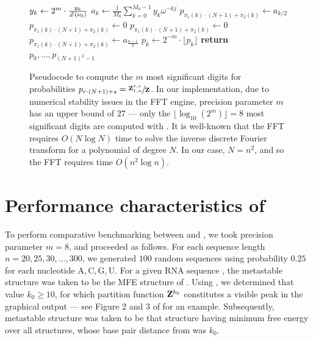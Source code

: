 \begin{figure}[!ht]
\begin{algorithmic}[1]
\State $y_k \gets 2^m \cdot \frac{y_k}{{\mathcal Z}_{}(\nu_0)}$
\EndFor
{}
\State $a_k \gets \frac{1}{M_0} \sum_{k=0}^{M_0-1} y_k \omega^{-kj}$
\EndFor
{}
\State $p_{\pi_1(k) \cdot (N+1) + \pi_2(k)} \gets a_{k/2}$
\Else
\State $p_{\pi_1(k) \cdot (N+1) + \pi_2(k)} \gets 0$
\EndIf
\Else
{}
\State $p_{\pi_1(k) \cdot (N+1) + \pi_2(k)} \gets 0$
\Else
\State $p_{\pi_1(k) \cdot (N+1) + \pi_2(k)} \gets a_{\frac{k-1}{2}}$
\EndIf
\EndIf
\EndFor
{}
\State $p_k \gets 2^{-m} \cdot \lfloor p_k \rfloor$
\EndFor
\State \textbf{return} $p_0,\dots,p_{(N + 1)^2 - 1}$
\EndFunction
\rule[-0.35ex]{0pt}{0pt}
\end{algorithmic}
\caption{
Pseudocode to compute the $m$ most significant digits
for probabilities
$p_{r\cdot(N + 1)+s} = \sfrac{{\bf Z}^{r,s}_{1,n}}{{\bf Z}^{}_{}}$. In our implementation,
due to numerical stability issues in the FFT engine, precision parameter
$m$ has an upper bound of $27$ --- only the $\lfloor \log_{10}(2^m) \rfloor =8$ most significant digits
are computed with \ffttwo. It is well-known that
the FFT requires $O(N \log N)$ time to solve the inverse discrete
Fourier transform for a polynomial of degree $N$. In our case,
$N=n^2$, and so the FFT requires time $O(n^2 \log n)$.
}
\end{figure}

\section{Performance characteristics of \ffttwo}
\label{sec:ffttwo:speed}

To perform comparative benchmarking between \rtwofold and \ffttwo,
we took precision parameter $m=8$, and proceeded as follows.
For each sequence length $n = 20,25,30,\ldots,300$, we generated
$100$ random sequences using probability $0.25$ for each nucleotide
A,\,C,\,G,\,U.
For a given RNA sequence \seq, the metastable structure \strA was
taken to be the MFE structure of \seq.
Using \rnabor, we determined that value $k_0 \geq 10$, for which
partition function ${\bf Z}^{k_0}_{}$ constitutes a visible peak in the graphical
output --- see Figure 2 and 3 of \cite{Freyhult.b07} for an example.
Subsequently, metastable structure \strB was taken to be that structure
having minimum free energy over all structures, whose base pair distance from
\strA was $k_0$.

